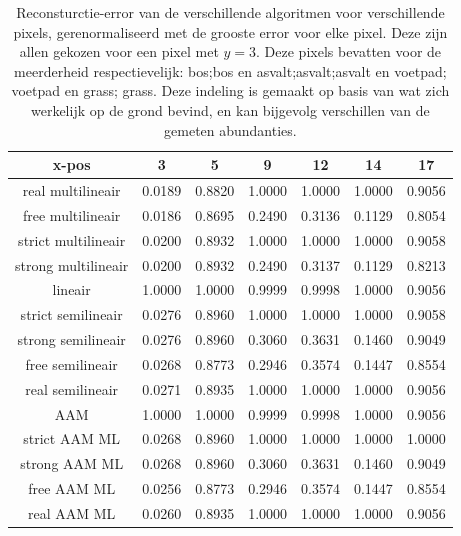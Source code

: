 \documentclass[12pt]{report}
\begin{document}
\begin{table}
\centering
\begin{tabular}{|c|c|c|c|c|c|c|}
\hline
x-pos&3 & 5 & 9 & 12 & 14 & 17 \\
\hline
real multilineair  & 0.0189 & 0.8820 & 1.0000 & 1.0000 & 1.0000 & 0.9056 \\
\hline
free multilineair  & 0.0186 & 0.8695 & 0.2490 & 0.3136 & 0.1129 & 0.8054 \\
\hline
strict multilineair  & 0.0200 & 0.8932 & 1.0000 & 1.0000 & 1.0000 & 0.9058 \\
\hline
strong multilineair  & 0.0200 & 0.8932 & 0.2490 & 0.3137 & 0.1129 & 0.8213 \\
\hline
lineair  & 1.0000 & 1.0000 & 0.9999 & 0.9998 & 1.0000 & 0.9056 \\
\hline
strict semilineair  & 0.0276 & 0.8960 & 1.0000 & 1.0000 & 1.0000 & 0.9058 \\
\hline
strong semilineair  & 0.0276 & 0.8960 & 0.3060 & 0.3631 & 0.1460 & 0.9049 \\
\hline
free semilineair  & 0.0268 & 0.8773 & 0.2946 & 0.3574 & 0.1447 & 0.8554 \\
\hline
real semilineair  & 0.0271 & 0.8935 & 1.0000 & 1.0000 & 1.0000 & 0.9056 \\
\hline
AAM  & 1.0000 & 1.0000 & 0.9999 & 0.9998 & 1.0000 & 0.9056 \\
\hline
strict AAM ML  & 0.0268 & 0.8960 & 1.0000 & 1.0000 & 1.0000 & 1.0000 \\
\hline
strong AAM ML  & 0.0268 & 0.8960 & 0.3060 & 0.3631 & 0.1460 & 0.9049 \\
\hline
free AAM ML  & 0.0256 & 0.8773 & 0.2946 & 0.3574 & 0.1447 & 0.8554 \\
\hline
real AAM ML  & 0.0260 & 0.8935 & 1.0000 & 1.0000 & 1.0000 & 0.9056 \\
\hline
\end{tabular}
\caption{Reconsturctie-error van de verschillende algoritmen voor verschillende pixels, gerenormaliseerd met de grooste error voor elke pixel. Deze zijn allen gekozen voor een pixel met $y=3$. Deze pixels bevatten voor de meerderheid respectievelijk: bos;bos en asvalt;asvalt;asvalt en voetpad; voetpad en grass; grass. Deze indeling is gemaakt op basis van wat zich werkelijk op de grond bevind, en kan bijgevolg verschillen van de gemeten abundanties.
\label{table:errosrn}}
\end{table}
\end{document}
